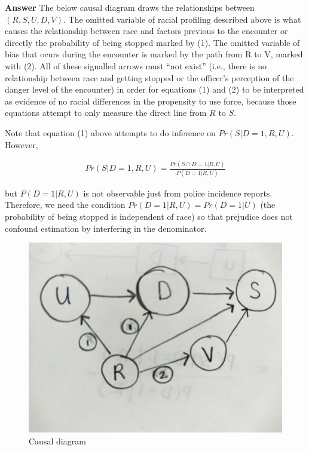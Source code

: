 \documentclass[11pt]{exam}
\begin{document}
\begin{questions}
\textbf{Answer} The below causal diagram draws the relationships between
\((R, S, U, D, V)\). The omitted variable of racial profiling described
above is what causes the relationship between race and factors previous
to the encounter or directly the probability of being stopped marked by
(1). The omitted variable of bias that ocurs during the encounter is
marked by the path from R to V, marked with (2). All of these signalled
arrows must ``not exist'' (i.e., there is no relationship between race
and getting stopped or the officer's perception of the danger level of
the encounter) in order for equations (1) and (2) to be interpreted as
evidence of no racial differences in the propensity to use force,
because those equations attempt to only measure the direct line from
\(R\) to \(S\).

Note that equation (1) above attempts to do inference on
\(Pr(S|D=1,R,U)\). However,

\begin{align*}Pr(S|D=1,R,U) = \frac{Pr(S\cap D = 1|R, U)}{P(D=1|R, U)}
\end{align*}

but \(P(D=1|R, U)\) is not observable just from police incidence
reports. Therefore, we need the condition
\(Pr(D = 1|R,U) = Pr(D = 1 | U)\) (the probability of being stopped is
independent of race) so that prejudice does not confound estimation by
interfering in the denominator.

    \begin{figure}
\centering
\includegraphics{causal_diagram.png}
\caption{Causal diagram}
\end{figure}


\end{questions}
\end{document}

